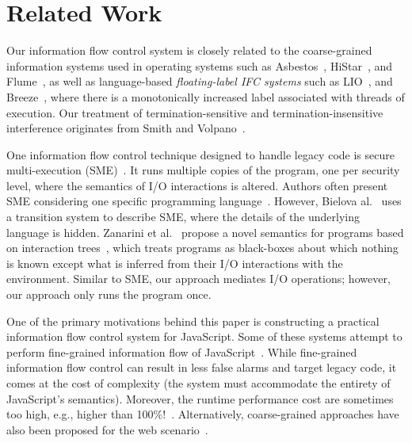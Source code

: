 \section{Related Work}
\label{sec:related}




Our information flow control system is closely related
to the coarse-grained information systems used in operating systems such
as Asbestos~\cite{efstathopoulos:asbestos}, 
HiStar~\cite{Zeldovich:2006}, and Flume~\cite{krohn:flume}, as well as language-based
\emph{floating-label IFC systems} such as LIO~\cite{lio},
and Breeze~\cite{Hritcu:2013:YIB:2497621.2498098}, where there is a
monotonically increased label
associated with threads of execution.
Our treatment of termination-sensitive and termination-insensitive interference
originates from Smith and Volpano~\cite{Smith:Volpano:MultiThreaded,Volpano:1997:ECF:794197.795081}.

One information flow control technique designed to handle legacy code is
secure multi-execution (SME)~\cite{Devriese:2010}. It runs
multiple copies of the program, one per security level, where the semantics of
I/O interactions is altered. Authors often present
SME considering one specific programming
language~\cite{KULeuven-350547,Rafnson:2013}. However, Bielova
al.~\cite{Biel-etal-11-TR} uses a transition system to describe SME, where the
details of the underlying language is hidden.  Zanarini et
al.~\cite{ZanariniJR13} propose a novel semantics for programs based on
interaction trees~\cite{jacobs-tutorial}, which treats programs as black-boxes
about which nothing is known except what is inferred from their I/O interactions
with the environment. Similar to SME, our approach mediates I/O
operations; however, our approach only runs the program once.


One of the primary motivations behind this paper is constructing a practical
information flow control system for JavaScript.  Some of these systems attempt
to perform fine-grained information flow of
JavaScript~\cite{Hedin:2012,ConDOM,JSFlow}. While fine-grained information flow
control can result in less false alarms and target legacy code, it comes at the
cost of complexity (the system must accommodate the entirety of JavaScript's
semantics). Moreover, the runtime performance cost are sometimes too high, e.g.,
higher than 100\%!~\cite{JSFlow}.  Alternatively, coarse-grained approaches have
also been proposed for the web
scenario~\cite{Yip:2009:PBS,DeGroef:2012,conf/esorics/AkhaweLHSS13}.


